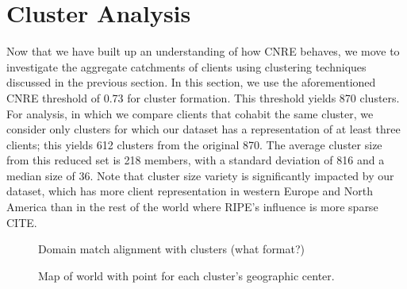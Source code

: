 \section{Cluster Analysis} \label{sect:analysis}

Now that we have built up an understanding of how CNRE behaves, we move to
investigate the aggregate catchments of clients using clustering techniques
discussed in the previous section. In this section, we use the aforementioned
CNRE threshold of 0.73 for cluster formation. This threshold yields 870
clusters.  For analysis, in which we compare clients that cohabit the same
cluster, we consider only clusters for which our dataset has a representation of
at least three clients; this yields 612 clusters from the original 870. The
average cluster size from this reduced set is 218 members, with a standard
deviation of 816 and a median size of 36. Note that cluster size variety is
significantly impacted by our dataset, which has more client representation
in western Europe and North America than in the rest of the world where RIPE's
influence is more sparse CITE.




\begin{figure}
    \caption{Domain match alignment with clusters (what format?)}
\end{figure}

\begin{figure}
    \caption{Map of world with point for each cluster's geographic center.}
\end{figure}

